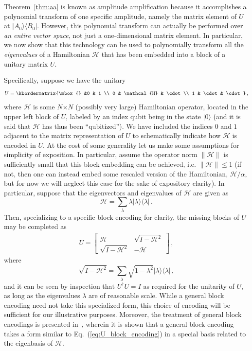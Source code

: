 \documentclass[aps,pra,showpacs,notitlepage,twocolumn,superscriptaddress,nofootinbib]{revtex4-1}
\def\>{\rangle}
\def\<{\langle}
\newcommand{\bea}{\begin{eqnarray}}
\newcommand{\eea}{\end{eqnarray}}
\newcommand{\mattwoc}[4]{\left(
	\begin{array}{cc}{#1}&{#2}\\{#3}&{#4}\end{array}\right)}
\begin{document}
Theorem~\ref{thm:aa} is known as amplitude amplification because it accomplishes a polynomial transform of one specific amplitude, namely the matrix element of $U$ at $|A_0\>\<B_0|$.  However, this polynomial transform can actually be performed over {\em an entire vector space}, not just a one-dimensional matrix element.  In particular, we now show that this technology can be used to polynomially transform all the {\em eigenvalues} of a Hamiltonian $\mathcal{H}$ that has been embedded into a block of a unitary matrix $U$.

Specifically, suppose we have the unitary
    \bea
        U = \kbordermatrix{\mbox{} &0 & 1 \\
          0 & \mathcal{H}     & \cdot \\ 
          1 & \cdot & \cdot 
        }
        \,,
        \label{eq:block_u_h}
    \eea
where $\mathcal{H}$ is some $N$$\times$$N$ (possibly very large) Hamiltonian operator, located in the upper left block of $U$, labeled by an index qubit being in the state $|0\>$ (and it is said that $\mathcal{H}$ has thus been ``qubitized''). We have included the indices $0$ and $1$ adjacent to the matrix representation of $U$ to schematically indicate how $\mathcal{H}$ is encoded in $U$. At the cost of some generality let us make some assumptions for simplicity of exposition.  In particular, assume the operator norm $\|\mathcal{H}\|$ is sufficiently small that this block embedding can be achieved, i.e. $\|\mathcal{H}\| \leq 1$ (if not, then one can instead embed some rescaled version of the Hamiltonian, $\mathcal{H}/\alpha$, but for now we will neglect this case for the sake of expository clarity). In particular, suppose that the eigenvectors and eigenvalues of $\mathcal{H}$ are given as
    \begin{equation}
        \mathcal{H} = \sum_\lambda \lambda |\lambda\>\<\lambda|
    \,.
    \end{equation}
Then, specializing to a specific block encoding for clarity, the missing blocks of $U$ may be completed as
    \bea
         U = \begin{bmatrix}
                \mathcal{H} & \sqrt{I-\mathcal{H}^2} \\
                \sqrt{I-\mathcal{H}^2} & -\mathcal{H} 
             \end{bmatrix}
         \,,
         \label{eq:U_block_encoding}
    \eea
where
    \begin{equation}
        \sqrt{I-\mathcal{H}^2} = \sum_\lambda \sqrt{1-\lambda^2} |\lambda\>\<\lambda|
        \,,
    \end{equation}
and it can be seen by inspection that $U^\dagger U = I$ as required for the unitarity of $U$, as long as the eigenvalues $\lambda$ are of reasonable scale. While a general block encoding need not take this specialized form, this choice of encoding will be sufficient for our illustrative purposes. Moreover, the treatment of general block encodings is presented in~\cite{Gily_n_2019, Low_2019}, wherein it is shown that a general block encoding takes a form similar to Eq.~(\ref{eq:U_block_encoding}) in a special basis related to the eigenbasis of $\mathcal{H}$.
\end{document}
